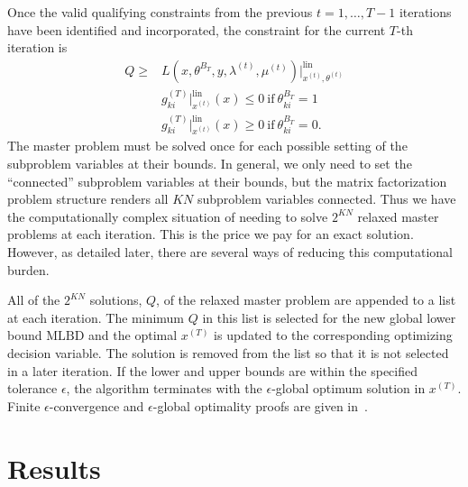 \documentclass[11pt]{article}
\renewcommand{\leq}{\leqslant}
\renewcommand{\geq}{\geqslant}
\begin{document}
Once the valid qualifying constraints from the previous $t=1,\ldots,T-1$ iterations have been identified and incorporated, the constraint for the current $T$-th iteration is
%
\begin{eqnarray*}
Q \geq & L(x,\theta^{B_T}, y, \lambda^{(t)},\mu^{(t)})\big\vert^{\text{lin}}_{x^{(t)}, \theta^{(t)}}\\
&g_{ki}^{(T)}\big\vert^{\text{lin}}_{x^{(t)}}(x) \leq 0 \ \text{if}\ \theta^{B_T}_{ki} = 1 \\
&g_{ki}^{(T)}\big\vert^{\text{lin}}_{x^{(t)}}(x) \geq 0 \ \text{if}\ \theta^{B_T}_{ki} = 0.
\end{eqnarray*}
%
The master problem must be solved once for each possible setting of the subproblem variables at their bounds. 
In general, we only need to set the ``connected'' subproblem variables at their bounds, but the matrix factorization problem structure renders all $KN$ subproblem variables connected. 
Thus we have the computationally complex situation of needing to solve $2^{KN}$ relaxed master problems at each iteration. 
This is the price we pay for an exact solution.
However, as detailed later, there are several ways of reducing this computational burden.

All of the $2^{KN}$ solutions, $Q$, of the relaxed master problem are appended to a list at each iteration. 
The minimum $Q$ in this list is selected for the new global lower bound $\text{MLBD}$ and the optimal $x^{(T)}$ is updated to the corresponding optimizing decision variable. 
The solution is removed from the list so that it is not selected in a later iteration. 
If the lower and upper bounds are within the specified tolerance $\epsilon$, the algorithm terminates with the $\epsilon$-global optimum solution in $x^{(T)}$. 
Finite $\epsilon$-convergence and $\epsilon$-global optimality proofs are given in~\cite{Floudas1994}.


\section{Results}\label{sec:results}
\end{document}
